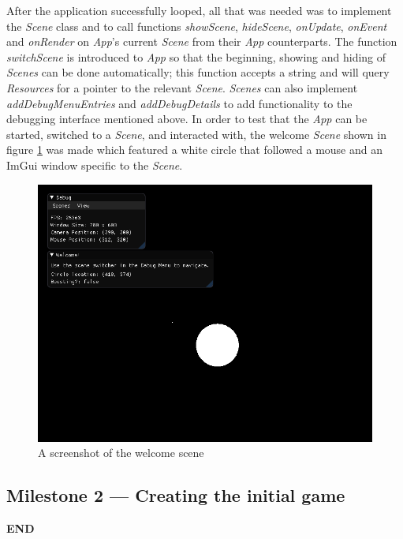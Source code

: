 \documentclass[11pt, a4paper]{report}
\begin{document}
After the application successfully looped, all that was needed was to implement the \emph{Scene} class and to call functions \emph{showScene}, \emph{hideScene}, \emph{onUpdate}, \emph{onEvent} and \emph{onRender} on \emph{App}'s current \emph{Scene} from their \emph{App} counterparts. The function \emph{switchScene} is introduced to \emph{App} so that the beginning, showing and hiding of \emph{Scenes} can be done automatically; this function accepts a string and will query \emph{Resources} for a pointer to the relevant \emph{Scene}. \emph{Scenes} can also implement \emph{addDebugMenuEntries} and \emph{addDebugDetails} to add functionality to the debugging interface mentioned above. In order to test that the \emph{App} can be started, switched to a \emph{Scene}, and interacted with, the welcome \emph{Scene} shown in figure \ref{fig:welcomeScene} was made which featured a white circle that followed a mouse and an ImGui window specific to the \emph{Scene}.

\begin{figure}[!h]
  \centering
  \includegraphics[width=\linewidth]{img/welcome_scene.png}
  \caption{A screenshot of the welcome scene}
  \label{fig:welcomeScene}
\end{figure}

\subsection[Creating the initial game]{Milestone 2 --- Creating the initial game}
\label{Creating the initial game}

\textbf{END}
\end{document}
